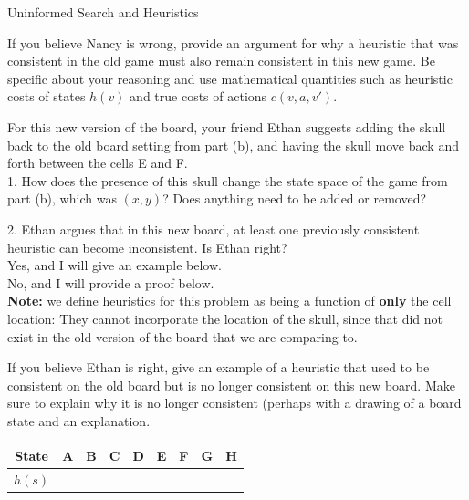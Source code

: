 \begin{problem}{Uninformed Search and Heuristics}
\begin{question}
\begin{subquestion}[8]
If you believe Nancy is wrong, provide an argument for why a heuristic that was consistent in the old game must also remain consistent in this new game. Be specific about your reasoning and use mathematical quantities such as heuristic costs of states $h(v)$ and true costs of actions $c(v,a,v')$.

\end{subquestion}

\newpage

\begin{subquestion}[8]For this new version of the board, your friend Ethan suggests adding the skull back to the old board setting from part (b), and having the skull move back and forth between the cells E and F. \\

1. How does the presence of this skull change the state space of the game from part (b), which was $(x,y)$? Does anything need to be added or removed?



2. Ethan argues that in this new board, at least one previously consistent heuristic can become inconsistent. Is Ethan right?\\

\mcqb Yes, and I will give an example below.\\

\mcqs No, and I will provide a proof below.\\

\textbf{Note:} we define heuristics for this problem as being a function of \textbf{only} the cell location: They cannot incorporate the location of the skull, since that did not exist in the old version of the board that we are comparing to.

\vspace{0.5em}
\hrulefill
\vspace{0.5em}

If you believe Ethan is right, give an example of a heuristic that used to be consistent on the old board but is no longer consistent on this new board. Make sure to explain why it is no longer consistent (perhaps with a drawing of a board state and an explanation. 

\def\arraystretch{1.5}
\setlength\tabcolsep{15pt}
\begin{center}
\begin{tabular}{|c|c|c|c|c|c|c|c|c|}
    \hline
      State & A & B & C & D & E & F & G & H  \\
    \hline
      $h(s)$ &  &  &  &  &  &  &  &  \\
    \hline
\end{tabular}
\end{center}




\end{subquestion}
\end{question}
\end{problem}
